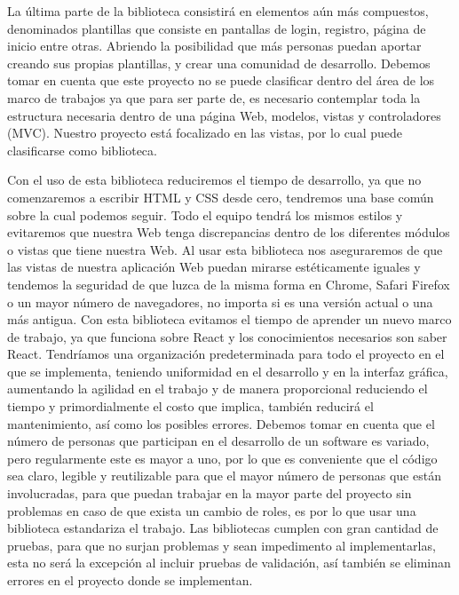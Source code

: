 La última parte de la biblioteca consistirá en elementos aún más compuestos, denominados plantillas que consiste en pantallas de login, registro, página de inicio entre otras. Abriendo la posibilidad que más personas puedan aportar creando sus propias plantillas, y crear una comunidad de desarrollo.  
Debemos tomar en cuenta que este proyecto no se puede clasificar dentro del área de los marco de trabajos ya que para ser parte de, es necesario contemplar toda la estructura necesaria dentro de una página Web, modelos, vistas y controladores (MVC). Nuestro proyecto está focalizado en las vistas, por lo cual puede clasificarse como biblioteca.  
  
Con el uso de esta biblioteca reduciremos el tiempo de desarrollo, ya que no comenzaremos a escribir HTML y  CSS desde cero, tendremos una base común sobre la cual podemos seguir. Todo el equipo tendrá los mismos estilos y evitaremos que nuestra Web tenga discrepancias dentro de los diferentes módulos o vistas que tiene nuestra Web. 
Al usar esta biblioteca nos aseguraremos de que las vistas de nuestra aplicación Web puedan mirarse estéticamente iguales y tendemos la seguridad de que luzca de la misma forma en Chrome, Safari Firefox o un mayor número de navegadores, no importa si es una versión actual o una más antigua. 
Con esta biblioteca evitamos el tiempo de aprender un nuevo marco de trabajo, ya que funciona sobre React y los conocimientos necesarios son saber React. 
Tendríamos una organización predeterminada para todo el proyecto en el que se implementa, teniendo uniformidad en el desarrollo y en la interfaz gráfica, aumentando la agilidad en el trabajo y de manera proporcional reduciendo el tiempo y primordialmente el costo que implica, también reducirá el mantenimiento, así como los posibles errores. 
Debemos tomar en cuenta que el número de personas que participan en el desarrollo de un software es variado, pero regularmente este es mayor a uno, por lo que es conveniente que el código sea claro, legible y reutilizable para que el mayor número de personas que están involucradas, para que puedan trabajar en la mayor parte del proyecto sin problemas en caso de que exista un cambio de roles, es por lo que usar una biblioteca estandariza el trabajo. 
Las bibliotecas cumplen con gran cantidad de pruebas, para que no surjan problemas y sean impedimento al implementarlas, esta no será la excepción al incluir pruebas de validación, así también se eliminan errores en el proyecto donde se implementan. 
  

